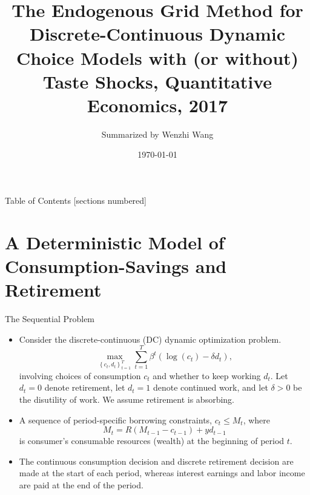 \documentclass[aspectratio=169]{beamer}
\title{The Endogenous Grid Method for Discrete-Continuous Dynamic Choice Models with (or without) Taste Shocks, Quantitative Economics, 2017}
\author{Summarized by Wenzhi Wang}
\institute{M.Phil. Student at the University of Oxford}
\date{\today}
\begin{document}
	
\begin{frame}
	\titlepage
\end{frame}

\begin{frame}{Table of Contents}
	[sections numbered]
	\tableofcontents %
\end{frame}



\section[Deterministic Model]{A Deterministic Model of Consumption-Savings and Retirement}

\begin{frame}{The Sequential Problem}

	\begin{itemize}
		\item Consider the discrete-continuous (DC) dynamic optimization problem.
		\begin{equation} \label{1}
			\max _{\left\{c_t, d_t\right\}_{t=1}^T} \sum_{t=1}^T \beta^t\left(\log \left(c_t\right)-\delta d_t\right),
		\end{equation}
		involving choices of consumption $c_t$ and whether to keep working $d_t$. Let $d_t=0$ denote retirement, let $d_t = 1$ denote continued work, and let $\delta >0$ be the disutility of work. We assume retirement is absorbing.
		\item A sequence of period-specific borrowing constraints, $c_t \leq M_t$, where $$M_t = R(M_{t-1} - c_{t-1}) + yd_{t-1}$$ is consumer's consumable resources (wealth) at the beginning of period $t$. 
		\item The continuous consumption decision and discrete retirement decision are made at the start of each period, whereas interest earnings and labor income are paid at the end of the period.
	\end{itemize}

\end{frame}
\end{document}
